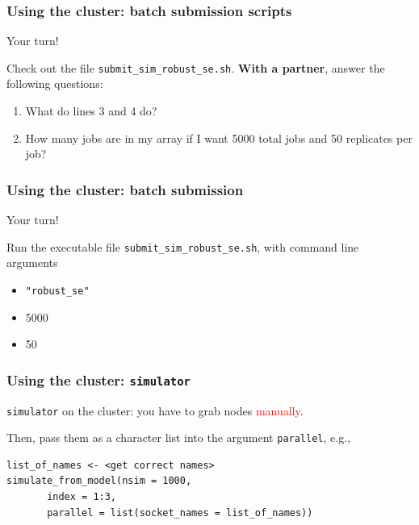 \documentclass[12pt, 
hyperref={colorlinks=true, linkcolor=BlueViolet, urlcolor=BlueViolet},dvipsnames]{beamer}
\begin{document}
\begin{frame}
\frametitle{Using the cluster: batch submission scripts}

Your turn!

Check out the file \texttt{submit\_sim\_robust\_se.sh}. \textbf{With a partner}, answer the following questions: \vspace{-0.3cm}
\begin{enumerate}
\item What do lines 3 and 4 do? 
\item How many jobs are in my array if I want 5000 total jobs and 50 replicates per job?
\end{enumerate}

\end{frame}

\begin{frame}
\frametitle{Using the cluster: batch submission}

Your turn! 

Run the executable file \texttt{submit\_sim\_robust\_se.sh}, with command line arguments \vspace{-0.3cm}
\begin{itemize}
\item \texttt{"robust\_se"}
\item 5000
\item 50
\end{itemize}
\end{frame}

\begin{frame}[fragile]
\frametitle{Using the cluster: \texttt{simulator}}
\texttt{simulator} on the cluster: you have to grab nodes \textcolor{red}{manually}. \pause

Then, pass them as a character list into the argument \texttt{parallel}, e.g., \pause
\begin{verbatim}
list_of_names <- <get correct names>
simulate_from_model(nsim = 1000, 
       index = 1:3, 
       parallel = list(socket_names = list_of_names))
\end{verbatim} 

\end{frame}
\end{document}
